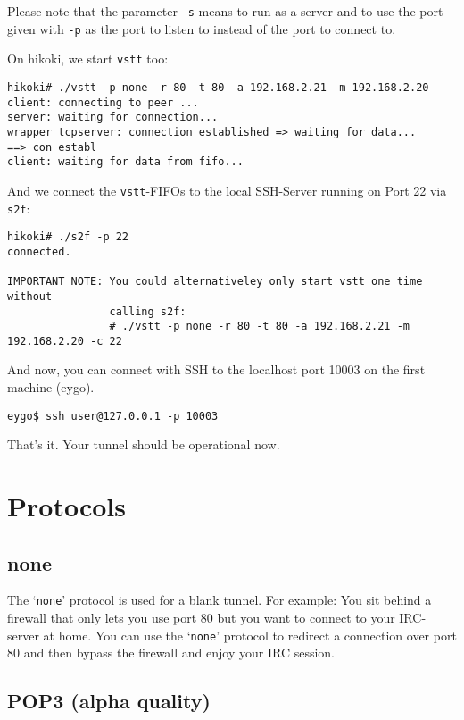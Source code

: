 \documentclass[10pt,a4paper]{article}
\begin{document}
Please note that the parameter \texttt{-s} means to run as a server and to use the port given with \texttt{-p} as the port to listen to instead of the port to connect to.

On hikoki, we start \texttt{vstt} too:

\begin{verbatim}
hikoki# ./vstt -p none -r 80 -t 80 -a 192.168.2.21 -m 192.168.2.20
client: connecting to peer ...
server: waiting for connection...
wrapper_tcpserver: connection established => waiting for data...
==> con establ
client: waiting for data from fifo...
\end{verbatim}

And we connect the \texttt{vstt}-FIFOs to the local SSH-Server running on Port 22 via \texttt{s2f}:

\begin{verbatim}
hikoki# ./s2f -p 22
connected.

IMPORTANT NOTE: You could alternativeley only start vstt one time without
                calling s2f:
                # ./vstt -p none -r 80 -t 80 -a 192.168.2.21 -m 192.168.2.20 -c 22
\end{verbatim}

And now, you can connect with SSH to the localhost port 10003 on the first machine (eygo).

\begin{verbatim}
eygo$ ssh user@127.0.0.1 -p 10003
\end{verbatim}

That's it. Your tunnel should be operational now.

\section{Protocols}

\subsection{none}

The `\texttt{none}' protocol is used for a blank tunnel. For example: You sit behind a firewall that only lets you use port 80 but you want to connect to your IRC-server at home. You can use the `\texttt{none}' protocol to redirect a connection over port 80 and then bypass the firewall and enjoy your IRC session.

\subsection{POP3 (alpha quality)}
\end{document}
